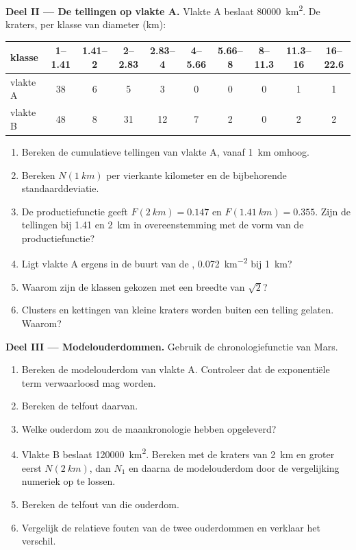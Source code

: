 \begin{problem}
\medskip\noindent\textbf{Deel II --- De tellingen op vlakte A.} Vlakte A
beslaat \qty{80000}{km^2}. De kraters, per klasse van diameter (km):
\begin{center}
\small
\begin{tabular}{lccccccccc}
\hline
klasse & 1--1.41 & 1.41--2 & 2--2.83 & 2.83--4 & 4--5.66 & 5.66--8 & 8--11.3 & 11.3--16 & 16--22.6 \\
\hline
vlakte A & 38 & 6 & 5 & 3 & 0 & 0 & 0 & 1 & 1 \\
vlakte B & 48 & 8 & 31 & 12 & 7 & 2 & 0 & 2 & 2 \\
\hline
\end{tabular}
\end{center}
\begin{enumerate}[resume]
\item Bereken de cumulatieve tellingen van vlakte A, vanaf \qty{1}{km} omhoog.
\item Bereken $N(\qty{1}{km})$ per vierkante kilometer en de
  bijbehorende standaarddeviatie.
\item De productiefunctie geeft $F(\qty{2}{km}) = 0.147$ en
  $F(\qty{1.41}{km}) = 0.355$. Zijn de tellingen bij 1.41 en \qty{2}{km}
  in overeenstemming met de vorm van de productiefunctie?
\item Ligt vlakte A ergens in de buurt van de ,
  \qty{0.072}{km^{-2}} bij \qty{1}{km}?
\item Waarom zijn de klassen gekozen met een breedte van $\sqrt2$?
\item Clusters en kettingen van kleine kraters worden buiten een telling gelaten. Waarom?
\end{enumerate}

\medskip\noindent\textbf{Deel III --- Modelouderdommen.} Gebruik de
chronologiefunctie van Mars.
\begin{enumerate}[resume]
\item Bereken de modelouderdom van vlakte A. Controleer dat de exponentiële term
  verwaarloosd mag worden.
\item Bereken de telfout daarvan.
\item Welke ouderdom zou de maankronologie hebben opgeleverd?
\item Vlakte B beslaat \qty{120000}{km^2}. Bereken met de kraters van \qty{2}{km}
  en groter eerst $N(\qty{2}{km})$, dan $N_1$ en daarna de modelouderdom door
  de vergelijking numeriek op te lossen.
\item Bereken de telfout van die ouderdom.
\item Vergelijk de relatieve fouten van de twee ouderdommen en verklaar het
  verschil.
\end{enumerate}


\end{problem}
